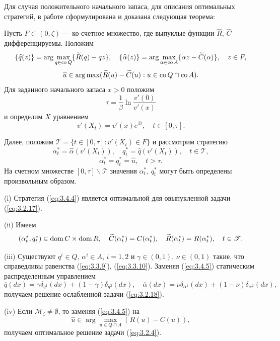 \documentclass[twoside,12pt]{article}
\begin{document}
Для случая положительного начального запаса, для описания оптимальных стратегий, в работе сформулирована и доказана следующая теорема:
\begin{theorem} \label{th:3.6}
Пусть $F\subset (0,\zeta)$ --- ко-счетное множество, где выпуклые функции $\widehat R$, $\widehat C$ дифференцируемы. Положим
$$ \{\widehat q(z)\}=\arg\max_{q\in {\rm co\,} Q} \{\widetilde R(q)-q z\},\quad
   \{\widehat\alpha(z)\}=\arg\max_{\alpha\in{\rm co\,} A}\{\alpha z-\widetilde C(\alpha)\},\quad z\in F,$$
$$\widehat u\in\arg\max(\widetilde R(u)-\widetilde C(u):u\in{\rm co\,} Q\cap{\rm co\,} A).$$
Для заданного начального запаса $x>0$ положим
$$\tau=\frac{1}{\beta}\ln\frac{v'(0)}{v'(x)}$$
и определим $X$ уравнением
$$ v'(X_t)=v'(x)e^{\beta t},\quad t\in [0,\tau]. $$

Далее, положим $\mathscr T=\{t\in [0,\tau]:v'(X_t)\in F\}$ и рассмотрим стратегию
\begin{equation} \label{eq:3.4.4}
\alpha^*_t=\widehat\alpha(v'(X_t)),\quad q^*_t=\widehat q(v'(X_t)),\quad t\in\mathscr T,
\end{equation}
\begin{equation} \label{eq:3.4.5}
 \alpha^*_t=q^*_t=\widehat u,\quad t>\tau.
\end{equation}
На счетном множестве $[0,\tau]\backslash \mathscr T$ значения $\alpha^*_t$, $q_t^*$ могут быть определены произвольным образом.

(i) Стратегия (\ref{eq:3.4.4}) является оптимальной для овыпукленной задачи (\ref{eq:3.2.17}).

(ii) Имеем
$$ (\alpha_t^*,q_t^*)\in{\rm dom\,} C\times{\rm dom\,} R,\quad \widetilde C(\alpha^*_t)=C(\alpha^*_t),\quad \widetilde R(\alpha_t^*)=R(\alpha_t^*),\quad t\in\mathscr T. $$

(iii) Существуют $q^i\in Q$, $\alpha^i\in A$, $i=1,2$ и $\gamma\in (0,1)$, $\nu\in (0,1)$ такие, что справедливы равенства (\ref{eq:3.3.9}), (\ref{eq:3.3.10}). Заменяя (\ref{eq:3.4.5}) статическим распределенным управлением
\begin{equation}
\overline q(dx)=\gamma\delta_{q^1}(dx)+(1-\gamma)\delta_{q^2}(dx),\quad \overline \alpha(dx) = \nu\delta_{\alpha^1}(dx) + (1-\nu)\delta_{\alpha^2}(dx),
\end{equation}
получаем решение ослабленной задачи (\ref{eq:3.2.18}).

(iv) Если $\mathscr M_\zeta\neq\emptyset$, то заменяя (\ref{eq:3.4.5}) на
$$ \widehat u\in\arg\max_{u\in Q\cap A}(R(u)-C(u)), $$
получаем оптимальное решение задачи (\ref{eq:3.2.4}).
\end{theorem}
\end{document}
